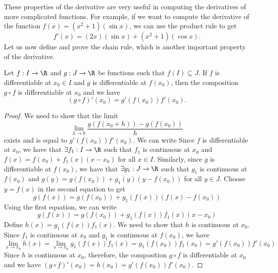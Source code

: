 \documentclass[openany]{book}
\begin{document}
These properties of the derivative are very useful in computing the derivatives of more complicated functions. For example, if we want to compute the derivative of the function $f(x) = (x^2 + 1)(\sin x)$, we can use the product rule to get
\[
    f'(x) = (2x)(\sin x) + (x^2 + 1)(\cos x).
\]
Let us now define and prove the chain rule, which is another important property of the derivative.
\begin{mytheorem}
    Let $f: I \to \R$ and $g: J \to \R$ be functions such that $f(I) \subseteq J$. If $f$ is differentiable at $x_0 \in I$ and $g$ is differentiable at $f(x_0)$, then the composition $g \circ f$ is differentiable at $x_0$ and we have
    \[
        (g \circ f)'(x_0) = g'(f(x_0)) f'(x_0).
    \]
\end{mytheorem}
\begin{proof}
    We need to show that the limit \[
        \lim_{h \to 0} \frac{g(f(x_0 + h)) - g(f(x_0))}{h}
    \]exists and is equal to $g'(f(x_0)) f'(x_0)$. We can write
Since $f$ is differentiable at $x_0$, we have that $\exists f_1: I \to \R$ such that $f_1$ is continuous at $x_0$ and $f(x) = f(x_0) + f_1(x)(x - x_0)$ for all $x \in I$. Similarly, since $g$ is differentiable at $f(x_0)$, we have that $\exists g_1: J \to \R$ such that $g_1$ is continuous at $f(x_0)$ and $g(y) = g(f(x_0)) + g_1(y)(y - f(x_0))$ for all $y \in J$. Choose $y = f(x)$ in the second equation to get
\[
    g(f(x)) = g(f(x_0)) + g_1(f(x))(f(x) - f(x_0))
\]
Using the first equation, we can write
\[
    g(f(x)) = g(f(x_0)) + g_1(f(x)) f_1(x)(x - x_0)
\]
Define $h(x) = g_1(f(x)) f_1(x)$. We need to show that $h$ is continuous at $x_0$. Since $f_1$ is continuous at $x_0$ and $g_1$ is continuous at $f(x_0)$, we have
\[
    \lim_{x \to x_0} h(x) = \lim_{x \to x_0} g_1(f(x)) f_1(x) = g_1(f(x_0)) f_1(x_0) = g'(f(x_0)) f'(x_0)
\]
Since $h$ is continuous at $x_0$, therefore, the composition $g \circ f$ is differentiable at $x_0$ and we have $(g \circ f)'(x_0) = h(x_0) = g'(f(x_0)) f'(x_0)$.
\end{proof}
\end{document}
